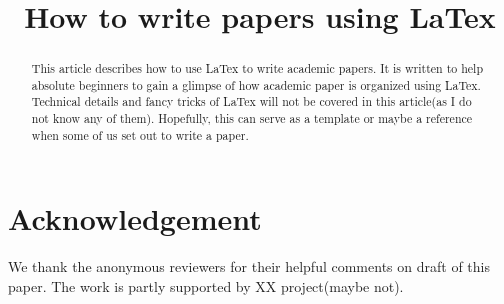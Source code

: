 \documentclass[conference]{IEEEtran}
\begin{document}
\newtheorem{example}{\textbf{Example}}[section]
\newtheorem{definition}{\textbf{Definition}}
\newtheorem{lemma}{\textbf{Lemma}}
\newtheorem{theorem}{\textbf{Theorem}}
\newtheorem{claim}{\textbf{Claim}}
\newtheorem{corollary}{\textbf{Corollary}}
\newtheorem{observation}{\textbf{Observation}}
\newtheorem{property}{\textbf{Property}}



\title{How to write papers using LaTex}

\author{
}

\maketitle

\begin{abstract}
This article describes how to use LaTex to write academic papers. It is written to help absolute beginners to gain a glimpse of how academic paper is organized using LaTex. Technical details and fancy tricks of LaTex will not be covered in this article(as I do not know any of them). Hopefully, this can serve as a template or maybe a reference when some of us set out to write a paper. 
\end{abstract}
















\section{Acknowledgement}
We thank the anonymous reviewers for their helpful comments on draft of this paper.
The work is partly supported by XX project(maybe not).





\end{document}
